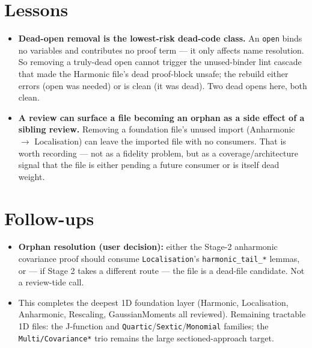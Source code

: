 \documentclass[11pt]{article}
\begin{document}
\section{Lessons}
\begin{itemize}[noitemsep]
  \item \textbf{Dead-open removal is the lowest-risk dead-code class.} An \texttt{open} binds no variables and
    contributes no proof term --- it only affects name resolution. So removing a truly-dead open cannot
    trigger the unused-binder lint cascade that made the Harmonic file's dead proof-block unsafe; the rebuild
    either errors (open was needed) or is clean (it was dead). Two dead opens here, both clean.
  \item \textbf{A review can surface a file becoming an orphan as a side effect of a sibling review.} Removing
    a foundation file's unused import (Anharmonic $\to$ Localisation) can leave the imported file with no
    consumers. That is worth recording --- not as a fidelity problem, but as a coverage/architecture signal
    that the file is either pending a future consumer or is itself dead weight.
\end{itemize}

\section{Follow-ups}
\begin{itemize}[noitemsep]
  \item \textbf{Orphan resolution (user decision):} either the Stage-2 anharmonic covariance proof should
    consume \texttt{Localisation}'s \texttt{harmonic\_tail\_*} lemmas, or --- if Stage 2 takes a different
    route --- the file is a dead-file candidate. Not a review-tide call.
  \item This completes the deepest 1D foundation layer (Harmonic, Localisation, Anharmonic, Rescaling,
    GaussianMoments all reviewed). Remaining tractable 1D files: the J-function and
    \texttt{Quartic}/\texttt{Sextic}/\texttt{Monomial} families; the \texttt{Multi/Covariance*} trio remains
    the large sectioned-approach target.
\end{itemize}
\end{document}
